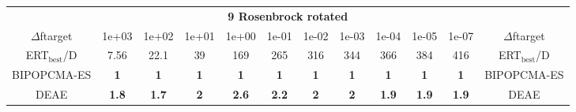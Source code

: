 \begin{tabular}{cccccccccccc}
 & \multicolumn{10}{c}{{\normalsize \textbf{9 Rosenbrock rotated}}}\\
$\Delta$ftarget& 1e+03& 1e+02& 1e+01& 1e+00& 1e-01& 1e-02& 1e-03& 1e-04& 1e-05& 1e-07 & $\Delta$ftarget \\
ERT$_{\textrm{best}}$/D& 7.56& 22.1& 39& 169& 265& 316& 344& 366& 384& 416 & ERT$_{\textrm{best}}$/D \\
\hline
BIPOPCMA-ES & \textbf{1} & \textbf{1} & \textbf{1} & \textbf{1} & \textbf{1} & \textbf{1} & \textbf{1} & \textbf{1} & \textbf{1} & \textbf{1} & BIPOPCMA-ES \cite{add_an_entry_for_BIPOPCMA-ES_in_bbob.bib}\\
DEAE & \textbf{1.8} & \textbf{1.7} & \textbf{2} & \textbf{2.6} & \textbf{2.2} & \textbf{2} & \textbf{2} & \textbf{1.9} & \textbf{1.9} & \textbf{1.9} & DEAE \cite{add_an_entry_for_DEAE_in_bbob.bib}
\end{tabular}
